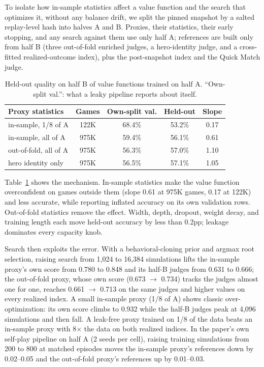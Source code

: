 \documentclass[journal]{IEEEtran}
\newcommand{\added}[1]{{\color{blue}#1}}
\newcommand{\added}[1]{#1}
\begin{document}
\added{To isolate how in-sample statistics affect a value function and the search that optimizes it, without any balance drift, we split the pinned snapshot by a salted replay-level hash into halves A and B. Proxies, their statistics, their early stopping, and any search against them use only half A; references are built only from half B (three out-of-fold enriched judges, a hero-identity judge, and a cross-fitted realized-outcome index), plus the post-snapshot index and the Quick Match judge.}

\begin{table}[t]
\centering
\caption{\added{Held-out quality on half B of value functions trained on half A. ``Own-split val.'': what a leaky pipeline reports about itself.}}
\label{tab:split}
\setlength{\tabcolsep}{3.5pt}
\begin{tabular}{lcccc}
\toprule
Proxy statistics & Games & Own-split val. & Held-out & Slope \\
\midrule
in-sample, 1/8 of A & 122K & 68.4\% & 53.2\% & 0.17 \\
in-sample, all of A & 975K & 59.4\% & 56.1\% & 0.61 \\
out-of-fold, all of A & 975K & 56.3\% & 57.0\% & 1.10 \\
hero identity only & 975K & 56.5\% & 57.1\% & 1.05 \\
\bottomrule
\end{tabular}
\end{table}

\added{Table~\ref{tab:split} shows the mechanism. In-sample statistics make the value function overconfident on games outside them (slope 0.61 at 975K games, 0.17 at 122K) and less accurate, while reporting inflated accuracy on its own validation rows. Out-of-fold statistics remove the effect. Width, depth, dropout, weight decay, and training length each move held-out accuracy by less than 0.2pp; leakage dominates every capacity knob.}

\added{Search then exploits the error. With a behavioral-cloning prior and argmax root selection, raising search from 1,024 to 16,384 simulations lifts the in-sample proxy's own score from 0.780 to 0.848 and its half-B judges from 0.631 to 0.666; the out-of-fold proxy, whose own score (0.673 $\to$ 0.734) tracks the judges almost one for one, reaches 0.661 $\to$ 0.713 on the same judges and higher values on every realized index. A small in-sample proxy (1/8 of A) shows classic over-optimization: its own score climbs to 0.932 while the half-B judges peak at 4,096 simulations and then fall. A leak-free proxy trained on 1/8 of the data beats an in-sample proxy with 8$\times$ the data on both realized indices. In the paper's own self-play pipeline on half A (2 seeds per cell), raising training simulations from 200 to 800 at matched episodes moves the in-sample proxy's references down by 0.02--0.05 and the out-of-fold proxy's references up by 0.01--0.03.}
\end{document}
